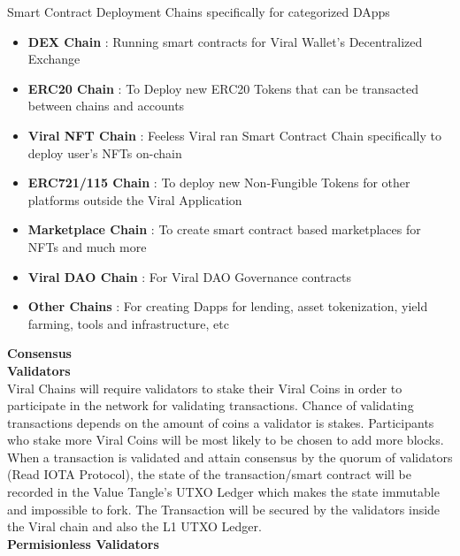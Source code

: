 \documentclass[conference]{IEEEtran}
\begin{document}
Smart Contract Deployment Chains specifically for categorized DApps
\begin{itemize}[wide, labelwidth=!, labelindent=0pt]

\item \textbf{DEX Chain} : Running smart contracts for Viral Wallet's Decentralized Exchange

\item \textbf{ERC20 Chain} : To Deploy new ERC20 Tokens that can be transacted between chains and accounts

\item \textbf{Viral NFT Chain} : Feeless Viral ran Smart Contract Chain specifically to deploy user's NFTs on-chain

\item \textbf{ERC721/115 Chain} : To deploy new Non-Fungible Tokens for other platforms outside the Viral Application

\item \textbf{Marketplace Chain} : To create smart contract based marketplaces for NFTs and much more

\item \textbf{Viral DAO Chain} : For Viral DAO Governance contracts

\item \textbf{Other Chains} : For creating Dapps for lending, asset tokenization, yield farming, tools and infrastructure, etc
\end{itemize}

\textbf{Consensus}\\


\textbf{Validators}\\

Viral Chains will require validators to stake their Viral Coins in order to participate in the network for validating transactions. Chance of validating transactions depends on the amount of coins a validator is stakes. Participants who stake more Viral Coins will be most likely to be chosen to add more blocks. When a transaction is validated and attain consensus by the quorum of validators (Read IOTA Protocol), the state of the transaction/smart contract will be recorded in the Value Tangle's UTXO Ledger which makes the state immutable and impossible to fork. The Transaction will be secured by the validators inside the Viral chain and also the L1 UTXO Ledger.\\

\textbf{Permisionless Validators}\\
\end{document}
